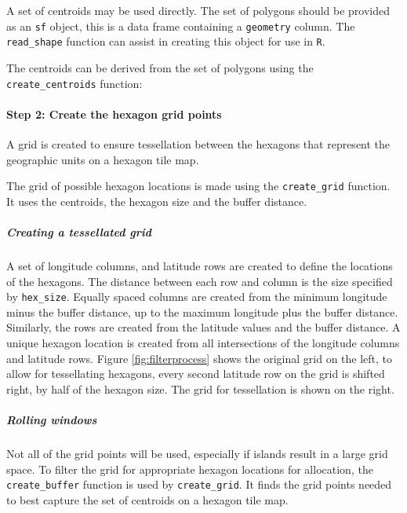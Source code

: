 A set of centroids may be used directly. The set of polygons should be
provided as an \texttt{sf} object, this is a data frame containing a
\texttt{geometry} column. The \texttt{read\_shape} function can assist
in creating this object for use in \texttt{R}.

The centroids can be derived from the set of polygons using the
\texttt{create\_centroids} function:

\hypertarget{step-2-create-the-hexagon-grid-points}{%
\paragraph{Step 2: Create the hexagon grid
points}\label{step-2-create-the-hexagon-grid-points}}

A grid is created to ensure tessellation between the hexagons that
represent the geographic units on a hexagon tile map.

The grid of possible hexagon locations is made using the
\texttt{create\_grid} function. It uses the centroids, the hexagon size
and the buffer distance.

\hypertarget{creating-a-tessellated-grid}{%
\subparagraph{Creating a tessellated
grid}\label{creating-a-tessellated-grid}}

A set of longitude columns, and latitude rows are created to define the
locations of the hexagons. The distance between each row and column is
the size specified by \texttt{hex\_size}. Equally spaced columns are
created from the minimum longitude minus the buffer distance, up to the
maximum longitude plus the buffer distance. Similarly, the rows are
created from the latitude values and the buffer distance. A unique
hexagon location is created from all intersections of the longitude
columns and latitude rows. Figure \ref{fig:filterprocess} shows the
original grid on the left, to allow for tessellating hexagons, every
second latitude row on the grid is shifted right, by half of the hexagon
size. The grid for tessellation is shown on the right.

\hypertarget{rolling-windows}{%
\subparagraph{Rolling windows}\label{rolling-windows}}

Not all of the grid points will be used, especially if islands result in
a large grid space. To filter the grid for appropriate hexagon locations
for allocation, the \texttt{create\_buffer} function is used by
\texttt{create\_grid}. It finds the grid points needed to best capture
the set of centroids on a hexagon tile map.

